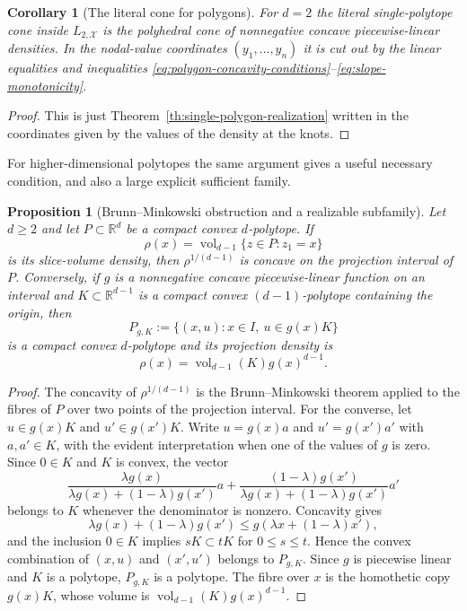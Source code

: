 \documentclass[reqno]{amsart}
\numberwithin{theorem}{section}
\newtheorem{proposition}[theorem]{Proposition}
\newtheorem{corollary}[theorem]{Corollary}
\newcommand{\RR}{\mathbb{R}}
\newcommand{\cX}{\mathcal{X}}
\begin{document}
\begin{corollary}[The literal cone for polygons]\label{cor:literal-cone-polygons}
For $d=2$ the literal single-polytope cone inside $L_{2,\cX}$ is the polyhedral cone of nonnegative concave piecewise-linear densities.  In the nodal-value coordinates $(y_1,\dots,y_n)$ it is cut out by the linear equalities and inequalities \eqref{eq:polygon-concavity-conditions}--\eqref{eq:slope-monotonicity}.
\end{corollary}

\begin{proof}
This is just Theorem~\ref{th:single-polygon-realization} written in the coordinates given by the values of the density at the knots.
\end{proof}



For higher-dimensional polytopes the same argument gives a useful necessary condition, and also a large explicit sufficient family.

\begin{proposition}[Brunn--Minkowski obstruction and a realizable subfamily]\label{prop:BM-obstruction}
Let $d\ge2$ and let $P\subset\RR^d$ be a compact convex $d$-polytope.  If
\[
\rho(x)=\operatorname{vol}_{d-1}\{z\in P:z_1=x\}
\]
is its slice-volume density, then $\rho^{1/(d-1)}$ is concave on the projection interval of $P$.
Conversely, if $g$ is a nonnegative concave piecewise-linear function on an interval and $K\subset\RR^{d-1}$ is a compact convex $(d-1)$-polytope containing the origin, then
\[
P_{g,K}:=\{(x,u): x\in I,\ u\in g(x)K\}
\]
is a compact convex $d$-polytope and its projection density is
\[
\rho(x)=\operatorname{vol}_{d-1}(K)g(x)^{d-1}.
\]
\end{proposition}

\begin{proof}
The concavity of $\rho^{1/(d-1)}$ is the Brunn--Minkowski theorem applied to the fibres of $P$ over two points of the projection interval. For the converse, let $u\in g(x)K$ and $u'\in g(x')K$. Write $u=g(x)a$ and $u'=g(x')a'$ with $a,a'\in K$, with the evident interpretation when one of the values of $g$ is zero. Since $0\in K$ and $K$ is convex, the vector
\[
\frac{\lambda g(x)}{\lambda g(x)+(1-\lambda)g(x')}a+
\frac{(1-\lambda)g(x')}{\lambda g(x)+(1-\lambda)g(x')}a'
\]
belongs to $K$ whenever the denominator is nonzero. Concavity gives
\[
\lambda g(x)+(1-\lambda)g(x')\leq g(\lambda x+(1-\lambda)x'),
\]
and the inclusion $0\in K$ implies $sK\subset tK$ for $0\le s\le t$. Hence the convex combination of $(x,u)$ and $(x',u')$ belongs to $P_{g,K}$. Since $g$ is piecewise linear and $K$ is a polytope, $P_{g,K}$ is a polytope. The fibre over $x$ is the homothetic copy $g(x)K$, whose volume is $\operatorname{vol}_{d-1}(K)g(x)^{d-1}$.
\end{proof}
\end{document}
